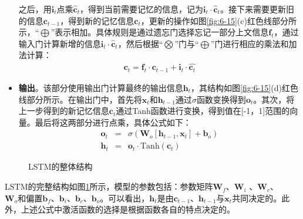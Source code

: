\begin{itemize}
之后，用$\mathbf{i}_t$点乘$\hat{\mathbf{c}}_t$，得到当前需要记忆的信息，记为$\mathbf{i}_t \cdot  \hat{\mathbf{c}}_t$。接下来需要更新旧的信息$\mathbf{c}_{t-1}$，得到新的记忆信息$\mathbf{c}_t$，更新的操作如图\ref{fig:6-15}(c)红色线部分所示，``$\bigoplus$''表示相加。具体规则是通过遗忘门选择忘记一部分上文信息$\mathbf{f}_t$，通过输入门计算新增的信息$\mathbf{i}_t \cdot  \hat{\mathbf{c}}_t$，然后根据``$\bigotimes$''门与``$\bigoplus$''门进行相应的乘法和加法计算：
\begin{eqnarray}
\mathbf{c}_t = \mathbf{f}_t \cdot \mathbf{c}_{t-1} + \mathbf{i}_t  \cdot \hat{\mathbf{c}_t}
\label{eq:6-15}
\end{eqnarray}
\vspace{-1.0em}
\item {\small\sffamily\bfseries{输出}}。该部分使用输出门计算最终的输出信息$\mathbf{h}_t$，其结构如图\ref{fig:6-15}(d)红色线部分所示。在输出门中，首先将$\mathbf{x}_t$和$\mathbf{h}_{t-1}$通过$\sigma$函数变换得到$\mathbf{o}_t$。其次，将上一步得到的新记忆信息$\mathbf{c}_t$通过Tanh函数进行变换，得到值在[-1，1]范围的向量。最后将这两部分进行点乘，具体公式如下：
\begin{eqnarray}
\mathbf{o}_t & = & \sigma (\mathbf{W}_o [\mathbf{h}_{t-1},\mathbf{x}_{t}] + \mathbf{b}_o ) \label{eq:6-16} \\
\mathbf{h}_t & = & \mathbf{o}_t \cdot \textrm{Tanh} (\mathbf{c}_t) \label{eq:6-17}
\end{eqnarray}
\vspace{0.5em}
\end{itemize}

\vspace{-2em}
\begin{figure}[htp]
\centering

\caption{LSTM的整体结构}
\label{fig:6-16}
\end{figure}

\parinterval LSTM的完整结构如图\ref{fig:6-16}所示，模型的参数包括：参数矩阵$\mathbf{W}_f$、$\mathbf{W}_i$ 、$\mathbf{W}_c$、\\$\mathbf{W}_o$和偏置$\mathbf{b}_f$、$\mathbf{b}_i$、$\mathbf{b}_c$、$\mathbf{b}_o$。可以看出，$\mathbf{h}_t$是由$\mathbf{c}_{t-1}$、$\mathbf{h}_{t-1}$与$\mathbf{x}_t$共同决定的。此外，上述公式中激活函数的选择是根据函数各自的特点决定的。



